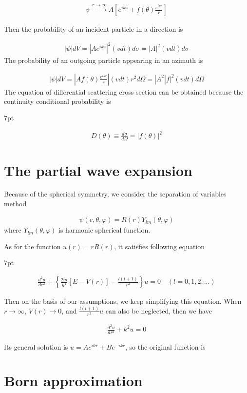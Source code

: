 \documentclass[12pt,openany]{book}
\newenvironment{formal}{%
\def\FrameCommand{%
\hspace{1pt}%
{\color{Blue}\vrule width 2pt}%
{\color{formalshade}\vrule width 4pt}%
\colorbox{formalshade}%
}%
\MakeFramed{\advance\hsize-\width\FrameRestore}%
\noindent\hspace{-4.55pt}%
\begin{adjustwidth}{}{7pt}%
\vspace{2pt}\vspace{2pt}%
}
{%
\vspace{2pt}\end{adjustwidth}\endMakeFramed%
}
\begin{document}
\begin{align}
    \psi \overset{r\rightarrow \infty}{\rightarrow}A\left[e^{ikz}+f(\theta)\frac{e^{ikr}}{r}\right]
\end{align}


Then the probability of an incident particle in a direction is 

\begin{align}
    |\psi|dV=|Ae^{ikz}|^{2}(vdt)d\sigma=|A|^{2}(vdt)d\sigma
\end{align}
The probability of an outgoing particle appearing in an azimuth is

\begin{align}
        |\psi|dV=\left|Af(\theta)\frac{e^{ikr}}{r}\right|(vdt)r^{2}d\Omega=|A^{2}|f|^{2}(vdt)d\Omega
    \end{align}
The equation of differential scattering cross section can be obtained because the continuity conditional probability is
\begin{formal}
    \begin{align}
        D(\theta)\equiv\frac{d\sigma}{d\Omega}=|f(\theta)|^{2}
    \end{align}
\end{formal}

\section{The partial wave expansion}

Because of the spherical symmetry, we consider the separation of variables method

\begin{align}
    \psi(e,\theta,\varphi)=R(r)Y_{lm}(\theta,\varphi)
\end{align}
where $Y_{lm}(\theta,\varphi)$ is harmonic spherical function.

As for the function $u(r)=rR(r)$, it satisfies following equation

\begin{formal}
    \begin{align}
        \frac{d^{2}u}{de^{2}}+\left\{\frac{2m}{\hbar^{2}}[E-V(r)]-\frac{l(l+1)}{r^{2}}\right\}u=0\quad (l=0,1,2,...)
    \end{align}
\end{formal}

Then on the basis of our assumptions, we keep simplifying this equation. When $r\rightarrow \infty$, $V(r)\rightarrow 0$, and $\frac{l(l+1)}{r^2}u$ can also be neglected, then we have

\begin{align}
    \frac{d^{2}u}{dr^{2}}+k^{2}u=0
\end{align}

Its general solution is $u=Ae^{ikr}+Be^{-ikr}$, so the original function is 

\section{Born approximation}
\end{document}
